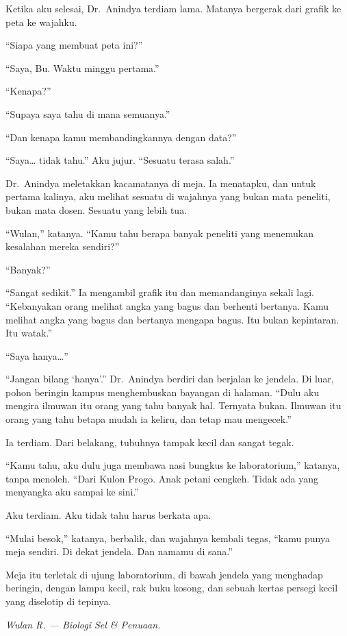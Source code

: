 \documentclass[11pt,twoside,openany]{book}
\makeatletter
\newcommand{\scenebreak}{\par\vspace{0.9em}{\centering\textsc{*\hspace{0.7em}*\hspace{0.7em}*}\par}\vspace{0.9em}\@afterindentfalse\@afterheading}
\makeatother
\begin{document}
Ketika aku selesai, Dr.~Anindya terdiam lama. Matanya bergerak dari grafik ke peta ke wajahku.

``Siapa yang membuat peta ini?''

``Saya, Bu. Waktu minggu pertama.''

``Kenapa?''

``Supaya saya tahu di mana semuanya.''

``Dan kenapa kamu membandingkannya dengan data?''

``Saya\ldots{} tidak tahu.'' Aku jujur. ``Sesuatu terasa salah.''

Dr.~Anindya meletakkan kacamatanya di meja. Ia menatapku, dan untuk pertama kalinya, aku melihat sesuatu di wajahnya yang bukan mata peneliti, bukan mata dosen. Sesuatu yang lebih tua.

``Wulan,'' katanya. ``Kamu tahu berapa banyak peneliti yang menemukan kesalahan mereka sendiri?''

``Banyak?''

``Sangat sedikit.'' Ia mengambil grafik itu dan memandanginya sekali lagi. ``Kebanyakan orang melihat angka yang bagus dan berhenti bertanya. Kamu melihat angka yang bagus dan bertanya mengapa bagus. Itu bukan kepintaran. Itu watak.''

``Saya hanya\ldots{}''

``Jangan bilang `hanya'.'' Dr.~Anindya berdiri dan berjalan ke jendela. Di luar, pohon beringin kampus menghembuskan bayangan di halaman. ``Dulu aku mengira ilmuwan itu orang yang tahu banyak hal. Ternyata bukan. Ilmuwan itu orang yang tahu betapa mudah ia keliru, dan tetap mau mengecek.''

Ia terdiam. Dari belakang, tubuhnya tampak kecil dan sangat tegak.

``Kamu tahu, aku dulu juga membawa nasi bungkus ke laboratorium,'' katanya, tanpa menoleh. ``Dari Kulon Progo. Anak petani cengkeh. Tidak ada yang menyangka aku sampai ke sini.''

Aku terdiam. Aku tidak tahu harus berkata apa.

``Mulai besok,'' katanya, berbalik, dan wajahnya kembali tegas, ``kamu punya meja sendiri. Di dekat jendela. Dan namamu di sana.''

\scenebreak
Meja itu terletak di ujung laboratorium, di bawah jendela yang menghadap beringin, dengan lampu kecil, rak buku kosong, dan sebuah kertas persegi kecil yang diselotip di tepinya.

\emph{Wulan R. --- Biologi Sel \& Penuaan.}
\end{document}
